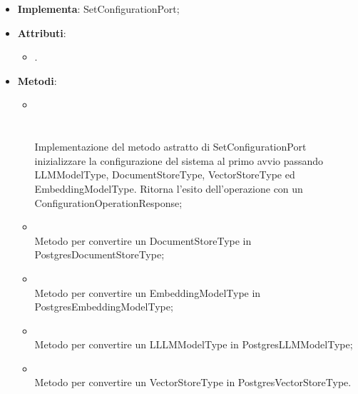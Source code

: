 \documentclass[10pt, a4paper]{article}
\begin{document}
\label{SetConfigurationPostgresDettaglio}
\begin{itemize}
    \item \textbf{Implementa}: SetConfigurationPort;
    \item \textbf{Attributi}:
    \begin{itemize}
        \item {}.
    \end{itemize}
    \item \textbf{Metodi}:
    \begin{itemize}
        \item {}\\ \\ \\
        Implementazione del metodo astratto di SetConfigurationPort inizializzare la configurazione del sistema al primo avvio passando LLMModelType, DocumentStoreType, VectorStoreType ed EmbeddingModelType. Ritorna l'esito dell'operazione con un ConfigurationOperationResponse;
        \item {}\\
        Metodo per convertire un DocumentStoreType in PostgresDocumentStoreType;
        \item {}\\
        Metodo per convertire un EmbeddingModelType in PostgresEmbeddingModelType;
        \item {}\\
        Metodo per convertire un LLLMModelType in PostgresLLMModelType;
        \item {}\\
        Metodo per convertire un VectorStoreType in PostgresVectorStoreType.

    \end{itemize}
\end{itemize}
\end{document}
